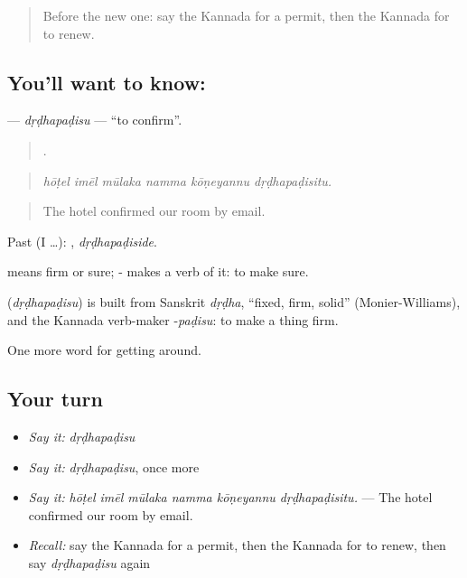 \label{lesson:KA-C440-drdhapadisu}



\begin{quote}
Before the new one: say the Kannada for a permit, then the Kannada for to renew.
\end{quote}

\subsection*{You'll want to know: }
\textbf{} — \emph{dṛḍhapaḍisu} — \textquotedblleft{}to confirm\textquotedblright{}.

\begin{quote}
     .
\end{quote}

\begin{quote}
\emph{hōṭel imēl mūlaka namma kōṇeyannu dṛḍhapaḍisitu.}
\end{quote}

\begin{quote}
The hotel confirmed our room by email.
\end{quote}

Past (I …): , \emph{dṛḍhapaḍiside}.

 means firm or sure; - makes a verb of it: to make sure.

\begin{cousinweb}
\textbf{} (\emph{dṛḍhapaḍisu}) is built from Sanskrit \emph{dṛḍha}, \textquotedblleft{}fixed, firm, solid\textquotedblright{} (Monier-Williams), and the Kannada verb-maker -\emph{paḍisu}: to make a thing firm.
\end{cousinweb}

\begin{grammarlens}[title={What you've built}]
One more word for getting around.
\end{grammarlens}

\subsection*{Your turn}
\begin{itemize}
\raggedright
  \item \emph{Say it:} \emph{dṛḍhapaḍisu}
  \item \emph{Say it:} \emph{dṛḍhapaḍisu}, once more
  \item \emph{Say it:} \emph{hōṭel imēl mūlaka namma kōṇeyannu dṛḍhapaḍisitu.} — The hotel confirmed our room by email.
  \item \emph{Recall:} say the Kannada for a permit, then the Kannada for to renew, then say \emph{dṛḍhapaḍisu} again
\end{itemize}

